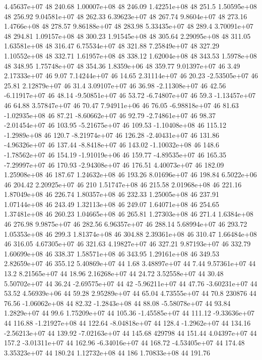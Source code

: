 4.45637e+07 48 240.68
1.00007e+08 48 246.09
1.42251e+08 48 251.5
1.50595e+08 48 256.92
9.04581e+07 48 262.33
6.39623e+07 48 267.74
9.8604e+07 48 273.16
1.4766e+08 48 278.57
9.86188e+07 48 283.98
5.33435e+07 48 289.4
3.70091e+07 48 294.81
1.09157e+08 48 300.23
1.91545e+08 48 305.64
2.29095e+08 48 311.05
1.63581e+08 48 316.47
6.75534e+07 48 321.88
7.25849e+07 48 327.29
1.10552e+08 48 332.71
1.61957e+08 48 338.12
1.62004e+08 48 343.53
1.5978e+08 48 348.95
1.75748e+07 48 354.36
1.8359e+06 48 359.77
9.01397e+07 46 3.49
2.17333e+07 46 9.07
7.14244e+07 46 14.65
2.31114e+07 46 20.23
-2.53505e+07 46 25.81
2.12879e+07 46 31.4
3.09107e+07 46 36.98
-2.11308e+07 46 42.56
-6.11917e+07 46 48.14
-9.50851e+07 46 53.72
-6.74807e+07 46 59.3
-1.13457e+07 46 64.88
3.57847e+07 46 70.47
7.94911e+06 46 76.05
-6.98818e+07 46 81.63
-1.02935e+08 46 87.21
-8.60662e+07 46 92.79
-2.74861e+07 46 98.37
-2.01454e+07 46 103.95
-5.21675e+07 46 109.53
-1.10408e+08 46 115.12
-1.2989e+08 46 120.7
-8.21974e+07 46 126.28
-2.40431e+07 46 131.86
-4.96326e+07 46 137.44
-8.8418e+07 46 143.02
-1.10032e+08 46 148.6
-1.78562e+07 46 154.19
-1.91019e+06 46 159.77
-4.89535e+07 46 165.35
-7.29997e+07 46 170.93
-2.94308e+07 46 176.51
4.40073e+07 46 182.09
1.25908e+08 46 187.67
1.24632e+08 46 193.26
8.01696e+07 46 198.84
6.5022e+06 46 204.42
2.20925e+07 46 210
1.51747e+08 46 215.58
2.01968e+08 46 221.16
1.87049e+08 46 226.74
1.80357e+08 46 232.33
1.25005e+08 46 237.91
1.07144e+08 46 243.49
1.32113e+08 46 249.07
1.64071e+08 46 254.65
1.37481e+08 46 260.23
1.04665e+08 46 265.81
1.27303e+08 46 271.4
1.6384e+08 46 276.98
9.9875e+07 46 282.56
6.96357e+07 46 288.14
5.68994e+07 46 293.72
1.05353e+08 46 299.3
1.81374e+08 46 304.88
2.39361e+08 46 310.47
1.66484e+08 46 316.05
4.67305e+07 46 321.63
4.19827e+07 46 327.21
9.87193e+07 46 332.79
1.60699e+08 46 338.37
1.58571e+08 46 343.95
1.29161e+08 46 349.53
2.82659e+07 46 355.12
5.40869e+07 44 1.68
3.48897e+07 44 7.44
9.57361e+07 44 13.2
8.21565e+07 44 18.96
2.16268e+07 44 24.72
3.52558e+07 44 30.48
5.50702e+07 44 36.24
-2.69575e+07 44 42
-5.96211e+07 44 47.76
-3.60231e+07 44 53.52
4.56939e+06 44 59.28
2.95289e+07 44 65.04
4.73555e+07 44 70.8
230876 44 76.56
-1.06062e+08 44 82.32
-1.2843e+08 44 88.08
-5.58078e+07 44 93.84
1.2829e+07 44 99.6
1.75209e+07 44 105.36
-1.45585e+07 44 111.12
-9.33636e+07 44 116.88
-1.21927e+08 44 122.64
-8.04818e+07 44 128.4
-1.2962e+07 44 134.16
-2.56213e+07 44 139.92
-7.02163e+07 44 145.68
429798 44 151.44
4.04397e+07 44 157.2
-3.01311e+07 44 162.96
-6.34016e+07 44 168.72
-4.53405e+07 44 174.48
3.35323e+07 44 180.24
1.12732e+08 44 186
1.70833e+08 44 191.76
